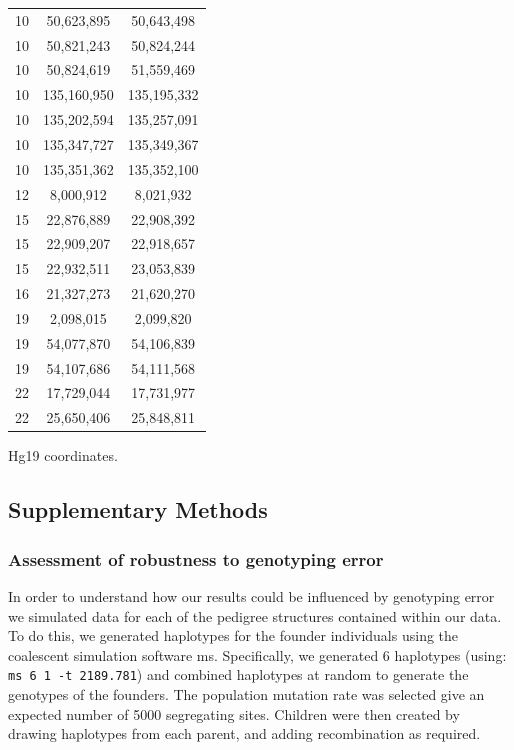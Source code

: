 \begin{table}[!h]
\begin{tabular}{|ccc|}
10 & 50,623,895 & 50,643,498 \\
10 & 50,821,243 & 50,824,244 \\
10 & 50,824,619 & 51,559,469 \\
10 & 135,160,950 & 135,195,332 \\
10 & 135,202,594 & 135,257,091 \\
10 & 135,347,727 & 135,349,367 \\
10 & 135,351,362 & 135,352,100 \\
12 & 8,000,912 & 8,021,932 \\
15 & 22,876,889 & 22,908,392 \\
15 & 22,909,207 & 22,918,657 \\
15 & 22,932,511 & 23,053,839 \\
16 & 21,327,273 & 21,620,270 \\
19 & 2,098,015 & 2,099,820 \\
19 & 54,077,870 & 54,106,839 \\
19 & 54,107,686 & 54,111,568 \\
22 & 17,729,044 & 17,731,977 \\
22 & 25,650,406 & 25,848,811 \\
    \hline \end{tabular}
     {
            Hg19 coordinates.  
    \label{tab:cointTS8}}
\end{table}

\subsection{Supplementary Methods}

\subsubsection{Assessment of robustness to genotyping error}

In order to understand how our results could be influenced by genotyping  
error we simulated data for each of the pedigree structures contained within our  
data.  To do this, we generated haplotypes for the founder individuals using the  
coalescent simulation software ms\cite{Hudson2002}.  Specifically, we generated 6 haplotypes (using:  
\verb|ms 6 1 -t 2189.781|) and combined haplotypes at random to generate the genotypes  
of the founders.  The population mutation rate was selected give an expected  
number of 5000 segregating sites. Children were then created by drawing  
haplotypes from each parent, and adding recombination as required.   

